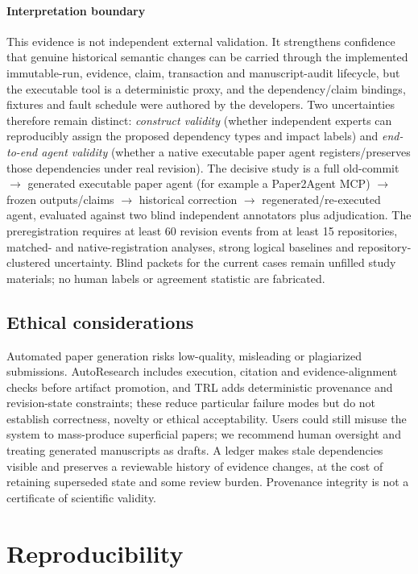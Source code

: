 \documentclass[journal]{IEEEtran}
\begin{document}
\paragraph{Interpretation boundary} This evidence is not independent external validation. It strengthens confidence that genuine historical semantic changes can be carried through the implemented immutable-run, evidence, claim, transaction and manuscript-audit lifecycle, but the executable tool is a deterministic proxy, and the dependency/claim bindings, fixtures and fault schedule were authored by the developers. Two uncertainties therefore remain distinct: \emph{construct validity} (whether independent experts can reproducibly assign the proposed dependency types and impact labels) and \emph{end-to-end agent validity} (whether a native executable paper agent registers/preserves those dependencies under real revision). The decisive study is a full old-commit $\to$ generated executable paper agent (for example a Paper2Agent MCP) $\to$ frozen outputs/claims $\to$ historical correction $\to$ regenerated/re-executed agent, evaluated against two blind independent annotators plus adjudication. The preregistration requires at least 60 revision events from at least 15 repositories, matched- and native-registration analyses, strong logical baselines and repository-clustered uncertainty. Blind packets for the current cases remain unfilled study materials; no human labels or agreement statistic are fabricated.

\subsection{Ethical considerations}
Automated paper generation risks low-quality, misleading or plagiarized submissions. AutoResearch includes execution, citation and evidence-alignment checks before artifact promotion, and TRL adds deterministic provenance and revision-state constraints; these reduce particular failure modes but do not establish correctness, novelty or ethical acceptability. Users could still misuse the system to mass-produce superficial papers; we recommend human oversight and treating generated manuscripts as drafts. A ledger makes stale dependencies visible and preserves a reviewable history of evidence changes, at the cost of retaining superseded state and some review burden. Provenance integrity is not a certificate of scientific validity.

\section{Reproducibility}
\end{document}
